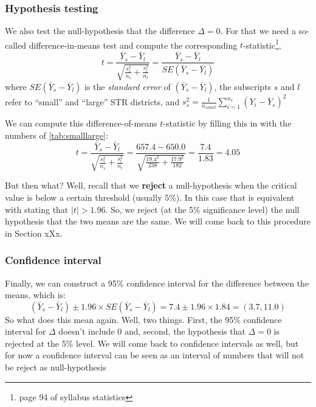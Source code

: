 \documentclass[
]{book}
\begin{document}
\hypertarget{hypothesis-testing}{%
\subsubsection{Hypothesis testing}\label{hypothesis-testing}}

We also test the null-hypothesis that the difference \(\Delta = 0\). For that we need a so-called difference-in-means test and compute the corresponding \(t\)-statistic\footnote{page 94 of syllabus statistics},
\begin{equation}
t = \frac{\bar{Y}_s - \bar{Y}_l}{\sqrt{\frac{s^2_s}{n_s} +\frac{s^2_l}{n_l} }} = \frac{\bar{Y}_s - \bar{Y}_l}{SE(\bar{Y}_s - \bar{Y}_l)}
\label{eq:testinglarge}
\end{equation}
where \(SE(\bar{Y}_s - \bar{Y}_l)\) is the \emph{standard error} of
\((\bar{Y}_s - \bar{Y}_l)\), the subscripts \(s\) and \(l\) refer to ``small'' and ``large'' STR districts, and \(s_s^2 = \frac{1}{n_{small}}\sum_{i=1}^{n_s}(Y_i - \bar{Y}_s)^2\)

We can compute this difference-of-means \(t\)-statistic by filling this in with the numbers of \ref{tab:smalllarge}:
\begin{equation}
t = \frac{\bar{Y}_s - \bar{Y}_l}{\sqrt{\frac{s^2_s}{n_s} +\frac{s^2_l}{n_l} }}  = \frac{657.4 - 650.0}{\sqrt{\frac{19.4^2}{238} +\frac{17.9^2}{182} }} = \frac{7.4}{1.83} = 4.05
\end{equation}

But then what? Well, recall that we \textbf{reject} a null-hypothesis when the critical value is below a certain threshold (usually 5\%). In this case that is equivalent with stating that \(|t|>1.96\). So, we reject (at the 5\% significance level) the null hypothesis that the two means are the same. We will come back to this procedure in Section xXx.

\hypertarget{confidence-interval}{%
\subsubsection{Confidence interval}\label{confidence-interval}}

Finally, we can construct a 95\% confidence interval for the difference between the means, which is:
\begin{equation}
(\bar{Y}_s - \bar{Y}_l)\pm 1.96 \times SE(\bar{Y}_s - \bar{Y}_l) = 7.4 \pm 1.96 \times 1.84 = (3.7, 11.0)
\label{eq:cilarge}
\end{equation}
So what does this mean again. Well, two things. First, the 95\% confidence interval for \(\Delta\) doesn't include 0 and, second, the hypothesis that \(\Delta = 0\) is rejected at the 5\% level. We will come back to confidence intervals as well, but for now a confidence interval can be seen as an interval of numbers that will not be reject as null-hypothesis
\end{document}
